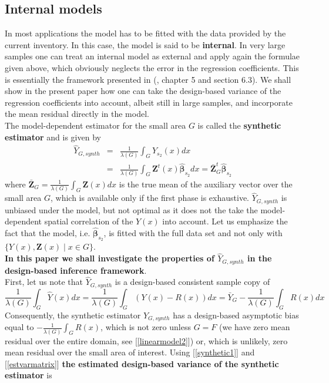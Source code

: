 \documentclass[a4paper,12pt,leqno, titlepage]{article}
\begin{document}
\subsection{Internal models}
In most applications the model has to be fitted with the data provided by the current inventory. In this case, the model is said to be \textbf{internal}. In very large samples one can treat an internal model as external and apply again the formulae given above, which obviously neglects the error in the regression coefficients. This is essentially the framework presented in (\cite{mandallaz}, chapter 5 and section 6.3). We shall show in the present paper how one can take the design-based variance of the regression coefficients into account, albeit still in large samples, and incorporate the mean residual directly in the model.\\
 The model-dependent estimator for the small area $G$ is called the
\textbf{synthetic estimator} and is given by
\begin{eqnarray}\label{synthetic1}
\hat{Y}_{G,synth}&=&\frac{1}{\lambda(G)}\int_G\hat{Y}_{s_2}(x)dx \\ \nonumber
&=& \frac{1}{\lambda(G)}\int_G \pmb{Z}^t(x)\hat{\pmb{\beta}}_{s_2}dx=\bar{\pmb{Z}}_G^t\hat{\pmb{\beta}}_{s_2}
\end{eqnarray}
where $\bar{\pmb{Z}}_G=\frac{1}{\lambda(G)}\int_G\pmb{Z}(x)dx$ is the true mean of the auxiliary vector over the small area $G$, which is available only if the first phase is exhaustive. $\hat{Y}_{G,synth}$ is unbiased under the model, but not optimal as it does not the take the model-dependent spatial correlation of the $Y(x)$ into account. Let us emphasize the fact that the model, i.e. $\hat{\pmb{\beta}}_{s_2}$, is fitted with the full data set and not only with $\{Y(x), \pmb{Z}(x)\mid x\in G\}$. \\
\textbf{In this paper we shall investigate the properties of $\hat{Y}_{G,synth}$ in the design-based inference framework}. \\
First, let us note that $\hat{Y}_{G,synth}$ is a design-based consistent sample copy of
 $$\frac{1}{\lambda(G)}\int_G \hat{Y}(x)dx=\frac{1}{\lambda(G)}\int_G(Y(x)-R(x))dx=\bar{Y}_G-\frac{1}{\lambda(G)}\int_G R(x)dx$$
 Consequently, the synthetic estimator $\hat{Y}_{G,synth}$ has a design-based asymptotic bias equal to $-\frac{1}{\lambda(G)}\int_GR(x)$, which is not zero unless $G=F$ (we have zero mean residual over the entire domain, see [\ref{linearmodel2}]) or, which is unlikely, zero mean residual over the small area of interest. Using [\ref{synthetic1}] and [\ref{estvarmatrix}] \textbf{the estimated design-based variance of the synthetic estimator} is
\end{document}
